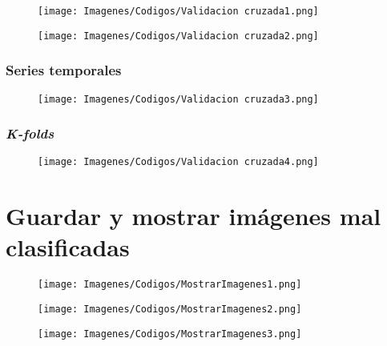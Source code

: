 \documentclass{report}
\begin{document}
\begin{figure}[H]
    \raggedright
    \texttt{[image: Imagenes/Codigos/Validacion cruzada1.png]}
\end{figure}

\begin{figure}[H]
    \raggedright
    \texttt{[image: Imagenes/Codigos/Validacion cruzada2.png]}
\end{figure}


\subsubsection{Series temporales}

\begin{figure}[H]
    \raggedright
    \texttt{[image: Imagenes/Codigos/Validacion cruzada3.png]}
\end{figure}


\subsubsection{\textit{K-folds}}


\begin{figure}[H]
    \raggedright
    \texttt{[image: Imagenes/Codigos/Validacion cruzada4.png]}
\end{figure}




\newpage

\section{Guardar y mostrar imágenes mal clasificadas}

\begin{figure}[H]
    \raggedright
    \texttt{[image: Imagenes/Codigos/MostrarImagenes1.png]}
\end{figure}

\begin{figure}[H]
    \raggedright
    \texttt{[image: Imagenes/Codigos/MostrarImagenes2.png]}
\end{figure}

\begin{figure}[H]
    \raggedright
    \texttt{[image: Imagenes/Codigos/MostrarImagenes3.png]}
\end{figure}





















\newpage



%
%
\printbibliography
\newpage
\thispagestyle{empty}
\afterpage{\null\newpage}
\end{document}
